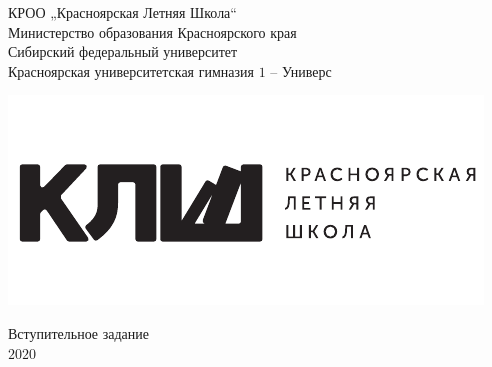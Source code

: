 \documentclass{article}
\newcommand{\Е}{{\fontencoding{X2}\selectfont\CYRYAT}} %
\newcommand{\е}{{\fontencoding{X2}\selectfont\cyryat}} %
\newcommand{\theyear}{$2020$}
\newlength{\SkipBetweenLine}
\newcommand{\TasksSize}{\fontsize{10pt}{\SkipBetweenLine}\selectfont}
\begin{document}

\thispagestyle{empty}
\rule{0pt}{0pt}
\enlargethispage{1\baselineskip}

{\centering
\mbox{}
\vspace{-4\baselineskip}

КРОО „Красноярская Летняя Школа“\\
Министерство образования Красноярского края\\
Сибирский федеральный университет\\
Красноярская университетская гимназия \textnumero $1$ – Универс

\vfill
\vspace{-4\baselineskip}
\includegraphics[scale=1]{./images/klsh_logo.pdf}\par
\vspace{-2\baselineskip}
{\fontsize{20}{60}\selectfont Вступительное задание}
\vfill
\ \\
\theyear{}

}



\newpage

\newlength{\LogoHeight}
\setlength{\LogoHeight}{67pt}

\vspace{1.4\baselineskip}




\TasksSize

\end{document}
